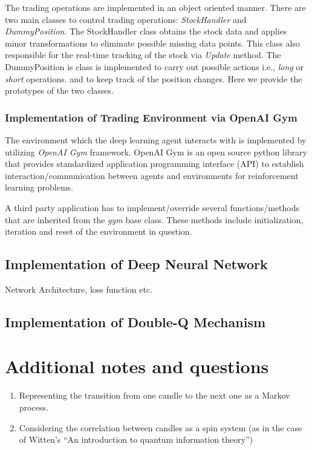 \documentclass[twocolumn,aps,pra,superscriptaddress,nofootinbib,longbibliography]{revtex4-2}
\begin{document}
The trading operations are implemented in an object oriented manner. There are two main classes to control trading operations: \textit{StockHandler} and \textit{DummyPosition}. The StockHandler class obtains the stock data and applies minor transformations to eliminate possible missing data points. This class also responsible for the real-time tracking of the stock via \textit{Update} method. The DummyPosition is class is implemented to carry out possible actions i.e., \textit{long} or \textit{short} operations. and to keep track of the position changes. Here we provide the prototypes of the two classes. 


\subsubsection{Implementation of Trading Environment via OpenAI Gym}

The environment which the deep learning agent interacts with is implemented by utilizing \textit{OpenAI Gym} framework. OpenAI Gym is an open source python library that provides standardized application programming interface (API) to establish interaction/communication between agents and environments for reinforcement learning problems. 

A third party application has to implement/override several functions/methods that are inherited from the \textit{gym} base class. These methods include initialization, iteration and reset of the environment in question. 



\subsection{Implementation of Deep Neural Network}

Network Architecture, loss function etc.

\subsection{Implementation of Double-Q Mechanism}

\section{Additional notes and questions}

\begin{enumerate}
    \item Representing the transition from one candle to the next one as a Markov process.
    \item Considering the correlation between candles as a spin system (as in the case of Witten's ``An introduction to quantum information theory'') 
\end{enumerate}




\clearpage



\end{document}
